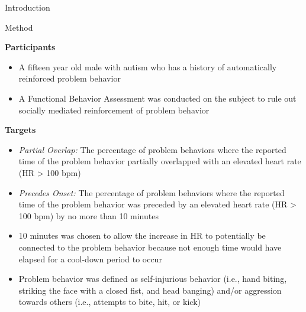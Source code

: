 \documentclass[final]{beamer}
\newlength{\onecolwid}
\begin{document}
\begin{frame}[t]
\begin{columns}[t]
\begin{column}{\onecolwid}
\begin{alertblock}{Introduction}
\begin{itemize}
	\end{itemize}

\end{alertblock}


\begin{alertblock}{Method}
	\begin{center}
		\textbf{Participants}
	\end{center}
	\begin{itemize}
		\item A fifteen year old male with autism who has a history of automatically reinforced problem behavior
		\item A Functional Behavior Assessment was conducted on the subject to rule out socially mediated reinforcement of problem behavior
	\end{itemize}

	\begin{center}
		\textbf{Targets}
	\end{center}
	\begin{itemize}
		\item \textit{Partial Overlap:} The percentage of problem behaviors where the reported time of the problem behavior partially overlapped with an elevated heart rate (HR > 100 bpm)
		\item \textit{Precedes Onset:} The percentage of problem behaviors where the reported time of the problem behavior was preceded by an elevated heart rate (HR > 100 bpm) by no more than 10 minutes
		\item 10 minutes was chosen to allow the increase in HR to potentially be connected to the problem behavior because not enough time would have elapsed for a cool-down period to occur
		\item Problem behavior was defined as self-injurious behavior (i.e., hand biting, striking the face with a closed fist, and head banging) and/or aggression towards others (i.e., attempts to bite, hit, or kick)
	\end{itemize}


\end{alertblock}
\end{column}
\end{columns}
\end{frame}
\end{document}
